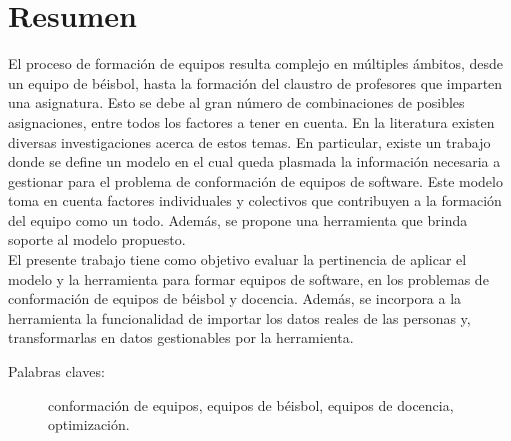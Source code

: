 \section*{Resumen}
El proceso de formación de equipos resulta complejo en múltiples ámbitos, desde un equipo de béisbol, hasta la formación del claustro de profesores que imparten una asignatura. Esto se debe al gran número de combinaciones de posibles asignaciones, entre todos los factores a tener en cuenta. En la literatura existen diversas investigaciones acerca de estos temas. En particular, existe un trabajo donde se define un modelo en el cual queda plasmada la información necesaria a gestionar para el problema de conformación de equipos de software. Este modelo toma en cuenta factores individuales y colectivos que contribuyen a la formación del equipo como un todo. Además, se propone una herramienta que brinda soporte al modelo propuesto. \\

El presente trabajo tiene como objetivo evaluar la pertinencia de aplicar el modelo y la herramienta para formar equipos de software, en los problemas de conformación de equipos de béisbol y docencia. Además, se incorpora a la herramienta la funcionalidad de importar los datos reales de las personas y, transformarlas en datos gestionables por la herramienta.

\begin{description}
	\item[Palabras claves:]{conformación de equipos, equipos de béisbol, equipos de docencia, optimización.}
\end{description}


